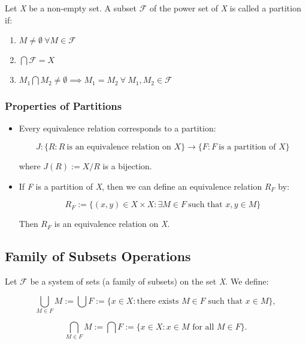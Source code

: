 Let \emph{X} be a non-empty set. A subset \(\mathscr{F}\) of the power set of \emph{X} is called a 
partition if:

\begin{enumerate}
	
	\item \(M \neq  \emptyset\ \forall M \in \mathscr{F}\)
 
	\item \(\bigcap \mathscr{F} = X\)
 
	\item \(M_1 \bigcap M_2 \ne \emptyset \implies M_1 = M_2\ \forall\ M_1, M_2 \in \mathscr{F} \) 

\end{enumerate}

\subsubsection{Properties of Partitions}

\begin{itemize}

	\item Every equivalence relation corresponds to a partition:

		  \[
		      J: \{ R : R\ \text{is an equivalence relation on } X\} \to \{ F: F\ \text{is a partition of } X\}
	      \]

	      where \( J(R) := X / R \) is a bijection.

	\item If \emph{F} is a partition of \emph{X}, then we can define an equivalence relation \( R_F \) by:
	      
		  \[
		      R_F := \{ (x, y) \in X \times X : \exists M \in F\ \text{such that } x, y \in M \}
	      \]
	      
		  Then \( R_F \) is an equivalence relation on \emph{X}.

\end{itemize}


\subsection{Family of Subsets Operations}

Let \(\mathscr{F}\) be a system of sets (a family of subsets) on the set \emph{X}. We define:

\[
	\bigcup_{M \in F} M := \bigcup F := \{ x \in X : \text{there exists } M \in F \text{ such that } x 
	\in M \} ,
\]

\[
	\bigcap_{M \in F} M := \bigcap F := \{ x \in X : x \in M \text{ for all } M \in F \} .
\]